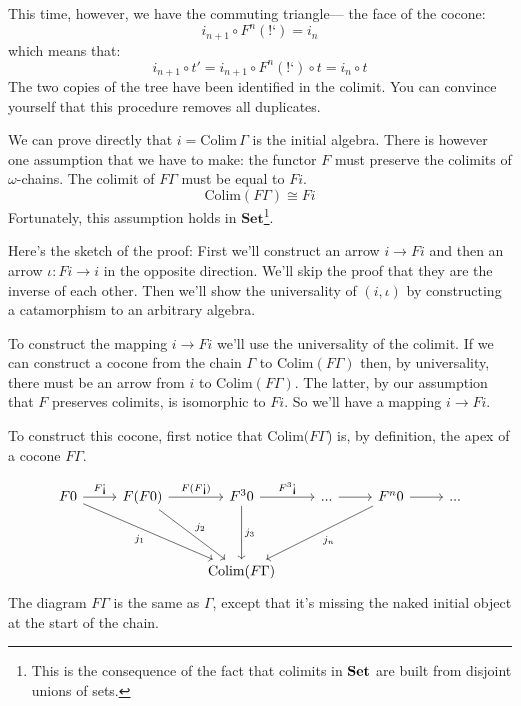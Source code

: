 \documentclass[DaoFP]{subfiles}
\begin{document}
This time, however, we have the commuting triangle--- the face of the cocone:
\[i_{n+1} \circ F^n (\mbox{!`}) = i_n \]
which means that:
\[ i_{n+1} \circ t' =  i_{n+1} \circ F^n (\mbox{!`}) \circ t =  i_n \circ t\]
The two copies of the tree have been identified in the colimit. You can convince yourself that this procedure removes all duplicates.

We can  prove directly that $i = \text{Colim}\, \Gamma$ is the initial algebra. There is however one assumption that we have to make: the functor $F$ must preserve the colimits of $\omega$-chains. The colimit of $F \Gamma$ must be equal to $F i$.
\[ \text{Colim} (F \Gamma) \cong F i \]
Fortunately, this assumption holds in $\mathbf{Set}$\footnote{This is the consequence of the fact that colimits in $\mathbf{Set}$ are built from disjoint unions of sets.}. 

Here's the sketch of the proof: First we'll construct an arrow $i \to F i$ and then an arrow $\iota \colon F i \to i$ in the opposite direction. We'll skip the proof that they are the inverse of each other. Then we'll show the universality of $(i, \iota)$ by constructing a catamorphism to an arbitrary algebra.

To construct the mapping $i \to F i$ we'll use the universality of the colimit. If we can construct a cocone from the chain $\Gamma$ to $\text{Colim} (F \Gamma)$ then, by universality, there must be an arrow from $i$ to $\text{Colim} (F \Gamma)$. The latter, by our assumption that $F$ preserves colimits, is isomorphic to $F i$. So we'll have a mapping $i \to F i$.

To construct this cocone, first notice that $\text{Colim} (F \Gamma$) is, by definition, the apex of a cocone $F \Gamma$. 

\[
 \begin{tikzcd}
 F 0
 \arrow[r, "F \mbox{!`}"]
 \arrow[ddrr, "j_1"']
 &  F (F 0)
  \arrow[r, "F(F  \mbox{!`})"]
 \arrow[ddr, "j_2"]
& F^3 0
  \arrow[r, "F^3\mbox{!`}"]
  \arrow[dd, "j_3"]
 & ...
 \arrow[r]
 & F^n 0
  \arrow[r]
 \arrow[ddll, "j_n"]
 & ...
 \\
 \\
 &&\text{Colim} (F \Gamma)
  \end{tikzcd}
\]
The diagram $F \Gamma$ is the same as $\Gamma$, except that it's missing the naked initial object at the start of the chain.
\end{document}
